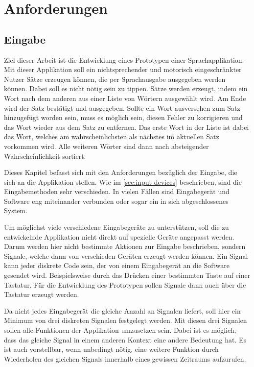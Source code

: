 \section{Anforderungen}
	\label{sec:requirements}
    
	\subsection{Eingabe}
    \label{sec:requirements-input}
 
    	Ziel dieser Arbeit ist die Entwicklung eines Prototypen einer Sprachapplikation. Mit dieser Applikation soll ein nichtsprechender und motorisch eingeschränkter Nutzer Sätze erzeugen können, die per Sprachausgabe ausgegeben werden können. Dabei soll es nicht nötig sein zu tippen. Sätze werden erzeugt, indem ein Wort nach dem anderen aus einer Liste von Wörtern ausgewählt wird. Am Ende wird der Satz bestätigt und ausgegeben. Sollte ein Wort ausversehen zum Satz hinzugefügt worden sein, muss es möglich sein, diesen Fehler zu korrigieren und das Wort wieder aus dem Satz zu entfernen. Das erste Wort in der Liste ist dabei das Wort, welches am wahrscheinlichsten als nächstes im aktuellen Satz vorkommen wird. Alle weiteren Wörter sind dann nach absteigender Wahrscheinlichkeit sortiert.
         
    	Dieses Kapitel befasst sich mit den Anforderungen bezüglich der Eingabe, die sich an die Applikation stellen. Wie im \autoref{sec:input-devices} beschrieben, sind die Eingabemethoden sehr verschieden. In vielen Fällen sind Eingabegerät und Software eng miteinander verbunden oder sogar ein in sich abgeschlossenes System.
        
        Um möglichst viele verschiedene Eingabegeräte zu unterstützen, soll die zu entwickelnde Applikation nicht direkt auf spezielle Geräte angepasst werden. Darum werden hier nicht bestimmte Aktionen zur Eingabe beschrieben, sondern Signale, welche dann von verschieden Geräten erzeugt werden können. Ein Signal kann jeder diskrete Code sein, der von einem Eingabegerät an die Software gesendet wird. Beispielsweise durch das Drücken einer bestimmten Taste auf einer Tastatur. Für die Entwicklung des Prototypen sollen Signale dann auch über die Tastatur erzeugt werden. 
        
        Da nicht jedes Eingabegerät die gleiche Anzahl an Signalen liefert, soll hier ein Minimum von drei diskreten Signalen festgelegt werden. Mit diesen drei Signalen sollen alle Funktionen der Applikation umzusetzen sein. Dabei ist es möglich, dass das gleiche Signal in einem anderen Kontext eine andere Bedeutung hat. Es ist auch vorstellbar, wenn unbedingt nötig, eine weitere Funktion durch Wiederholen des gleichen Signals innerhalb eines gewissen Zeitraums aufzurufen. 
        
